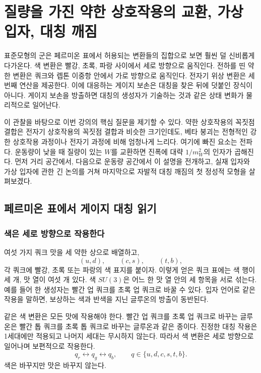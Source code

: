 \chapter{질량을 가진 약한 상호작용의 교환, 가상 입자, 대칭 깨짐}

표준모형의 군은 페르미온 표에서 허용되는 변환들의 집합으로 보면 훨씬 덜 신비롭게 다가온다. 색 변환은 빨강, 초록, 파랑 사이에서 세로 방향으로 움직인다. 전하를 띤 약한 변환은 쿼크와 렙톤 이중항 안에서 가로 방향으로 움직인다. 전자기 위상 변환은 세 번째 연산을 제공한다. 이에 대응하는 게이지 보손은 대칭을 찾은 뒤에 덧붙인 장식이 아니다. 게이지 보손을 방출하면 대칭의 생성자가 기술하는 것과 같은 상태 변화가 물리적으로 일어난다.

이 관찰을 바탕으로 이번 강의의 핵심 질문을 제기할 수 있다. 약한 상호작용의 꼭짓점 결합은 전자기 상호작용의 꼭짓점 결합과 비슷한 크기인데도, 베타 붕괴는 전형적인 강한 상호작용 과정이나 전자기 과정에 비해 엄청나게 느리다. 여기에 빠진 요소는 전파다. 운동량이 낮을 때 질량이 있는 \(W\)를 교환하면 진폭에 대략 \(1/m_W^2\)의 인자가 곱해진다. 먼저 거리 공간에서, 다음으로 운동량 공간에서 이 설명을 전개하고, 실재 입자와 가상 입자에 관한 긴 논의를 거쳐 마지막으로 자발적 대칭 깨짐의 첫 정성적 모형을 살펴보겠다.

\section{페르미온 표에서 게이지 대칭 읽기}

\subsection{색은 세로 방향으로 작용한다}

여섯 가지 쿼크 맛을 세 약한 상으로 배열하고,
\begin{equation}
  (u,d),\qquad(c,s),\qquad(t,b),
\end{equation}
각 쿼크에 빨강, 초록 또는 파랑의 색 표지를 붙이자. 이렇게 얻은 쿼크 표에는 색 행이 세 개, 맛 열이 여섯 개 있다. 색 \(SU(3)\)은 어느 한 맛 열 안의 세 항목을 서로 섞는다. 예를 들어 한 생성자는 빨간 업 쿼크를 초록 업 쿼크로 바꿀 수 있다. 입자 언어로 같은 작용을 말하면, 보상하는 색과 반색을 지닌 글루온의 방출이 동반된다.

같은 색 변환은 모든 맛에 작용해야 한다. 빨간 업 쿼크를 초록 업 쿼크로 바꾸는 글루온은 빨간 톱 쿼크를 초록 톱 쿼크로 바꾸는 글루온과 같은 종이다. 진정한 대칭 작용은 1세대에만 적용되고 나머지 세대는 무시하지 않는다. 따라서 색 변환은 세로 방향으로 일어나며 보편적으로 작용한다.
\begin{equation}
  q_r\longleftrightarrow q_g\longleftrightarrow q_b,
  \qquad q\in\{u,d,c,s,t,b\}.
\end{equation}
색은 바꾸지만 맛은 바꾸지 않는다.

